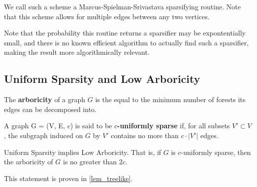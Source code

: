 We call such a scheme a Marcus-Spielman-Srivastava sparsifying routine. Note that this scheme allows for multiple edges between any two vertices. 

Note that the probability this routine returns a sparsifier may be expontentially small, and there is no known efficient algorithm to actually find such a sparsifier, making the \cite{SpielmanS08} result more algorithmically relevant.
\subsection{Uniform Sparsity and Low Arboricity}

\begin{definition}
The \textbf{arboricity} of a graph $G$ is the equal to the minimum number of forests its edges can be decomposed into.
\end{definition}
\begin{definition}
A graph G = (V, E, $c$) is said to be \textbf{$c$-uniformly sparse} if, for all subsets $V' \subset V$, the subgraph induced on $G$ by $V'$ contains no more than $c \cdot |V'|$ edges.
\end{definition}

\begin{lemma} \label{lowarb}
Uniform Sparsity implies Low Arboricity. That is, if $G$ is $c$-uniformly sparse, then the arboricity of $G$ is no greater than $2c$.
\end{lemma}
This statement is proven in \ref{lem_treelike}.

